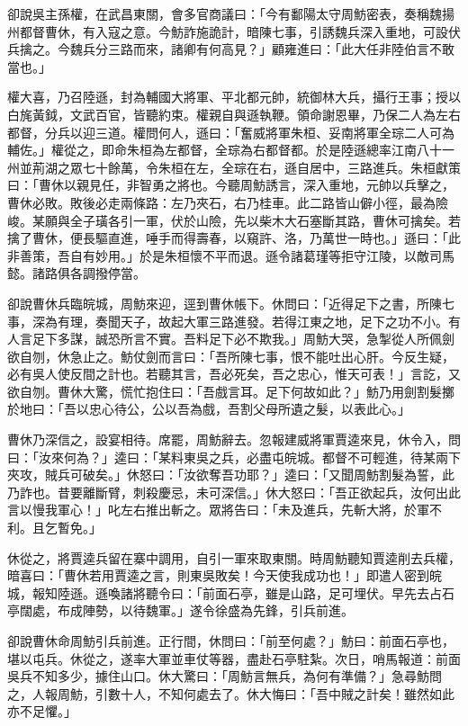 卻說吳主孫權，在武昌東關，會多官商議曰：「今有鄱陽太守周魴密表，奏稱魏揚州都督曹休，有入寇之意。今魴詐施詭計，暗陳七事，引誘魏兵深入重地，可設伏兵擒之。今魏兵分三路而來，諸卿有何高見？」顧雍進曰：「此大任非陸伯言不敢當也。」

權大喜，乃召陸遜，封為輔國大將軍、平北都元帥，統御林大兵，攝行王事；授以白旄黃鉞，文武百官，皆聽約束。權親自與遜執鞭。領命謝恩畢，乃保二人為左右都督，分兵以迎三道。權問何人，遜曰：「奮威將軍朱桓、妥南將軍全琮二人可為輔佐。」權從之，即命朱桓為左都督，全琮為右都督都。於是陸遜總率江南八十一州並荊湖之眾七十餘萬，令朱桓在左，全琮在右，遜自居中，三路進兵。朱桓獻策曰：「曹休以親見任，非智勇之將也。今聽周魴誘言，深入重地，元帥以兵擊之，曹休必敗。敗後必走兩條路：左乃夾石，右乃桂車。此二路皆山僻小徑，最為險峻。某願與全子璜各引一軍，伏於山險，先以柴木大石塞斷其路，曹休可擒矣。若擒了曹休，便長驅直進，唾手而得壽春，以窺許、洛，乃萬世一時也。」遜曰：「此非善策，吾自有妙用。」於是朱桓懷不平而退。遜令諸葛瑾等拒守江陵，以敵司馬懿。諸路俱各調撥停當。

卻說曹休兵臨皖城，周魴來迎，逕到曹休帳下。休問曰：「近得足下之書，所陳七事，深為有理，奏聞天子，故起大軍三路進發。若得江東之地，足下之功不小。有人言足下多謀，誠恐所言不實。吾料足下必不欺我。」周魴大哭，急掣從人所佩劍欲自刎，休急止之。魴仗劍而言曰：「吾所陳七事，恨不能吐出心肝。今反生疑，必有吳人使反間之計也。若聽其言，吾必死矣，吾之忠心，惟天可表！」言訖，又欲自刎。曹休大驚，慌忙抱住曰：「吾戲言耳。足下何故如此？」魴乃用劍割髮擲於地曰：「吾以忠心待公，公以吾為戲，吾割父母所遺之髮，以表此心。」

曹休乃深信之，設宴相待。席罷，周魴辭去。忽報建威將軍賈逵來見，休令入，問曰：「汝來何為？」逵曰：「某料東吳之兵，必盡屯皖城。都督不可輕進，待某兩下夾攻，賊兵可破矣。」休怒曰：「汝欲奪吾功耶？」逵曰：「又聞周魴割髮為誓，此乃詐也。昔要離斷臂，刺殺慶忌，未可深信。」休大怒曰：「吾正欲起兵，汝何出此言以慢我軍心！」叱左右推出斬之。眾將告曰：「未及進兵，先斬大將，於軍不利。且乞暫免。」

休從之，將賈逵兵留在寨中調用，自引一軍來取東關。時周魴聽知賈逵削去兵權，暗喜曰：「曹休若用賈逵之言，則東吳敗矣！今天使我成功也！」即遣人密到皖城，報知陸遜。遜喚諸將聽令曰：「前面石亭，雖是山路，足可埋伏。早先去占石亭闊處，布成陣勢，以待魏軍。」遂令徐盛為先鋒，引兵前進。

卻說曹休命周魴引兵前進。正行間，休問曰：「前至何處？」魴曰：前面石亭也，堪以屯兵。休從之，遂率大軍並車仗等器，盡赴石亭駐紮。次日，哨馬報道：前面吳兵不知多少，據住山口。休大驚曰：「周魴言無兵，為何有準備？」急尋魴問之，人報周魴，引數十人，不知何處去了。休大悔曰：「吾中賊之計矣！雖然如此亦不足懼。」

